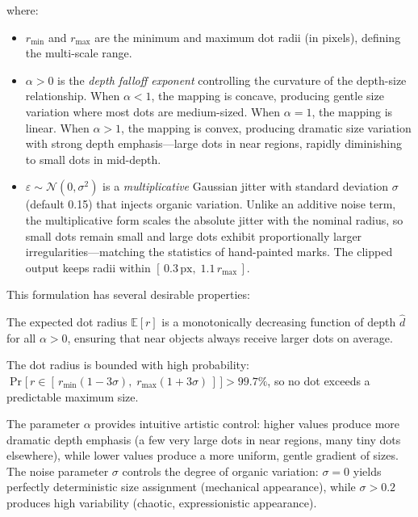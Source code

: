 \noindent where:
\begin{itemize}
    \item $r_{\min}$ and $r_{\max}$ are the minimum and maximum dot
    radii (in pixels), defining the multi-scale range.
    \item $\alpha > 0$ is the \emph{depth falloff exponent} controlling
    the curvature of the depth-size relationship. When $\alpha < 1$,
    the mapping is concave, producing gentle size variation where most
    dots are medium-sized. When $\alpha = 1$, the mapping is linear.
    When $\alpha > 1$, the mapping is convex, producing dramatic size
    variation with strong depth emphasis---large dots in near regions,
    rapidly diminishing to small dots in mid-depth.
    \item $\varepsilon \sim \mathcal{N}(0, \sigma^2)$ is a
    \emph{multiplicative} Gaussian jitter with standard deviation
    $\sigma$ (default 0.15) that injects organic variation. Unlike an
    additive noise term, the multiplicative form scales the absolute
    jitter with the nominal radius, so small dots remain small and
    large dots exhibit proportionally larger irregularities---matching
    the statistics of hand-painted marks. The clipped output keeps
    radii within $[\,0.3\,\mathrm{px},\; 1.1\, r_{\max}\,]$.
\end{itemize}

This formulation has several desirable properties:
\begin{proposition}[Monotonicity]
The expected dot radius $\mathbb{E}[r]$ is a monotonically decreasing
function of depth $\hat{d}$ for all $\alpha > 0$, ensuring that near
objects always receive larger dots on average.
\end{proposition}

\begin{proposition}[Boundedness]
The dot radius is bounded with high probability:
$\Pr\!\bigl[\, r \in [\,r_{\min}(1 - 3\sigma),\; r_{\max}(1 + 3\sigma)\,] \,\bigr] > 99.7\%$,
so no dot exceeds a predictable maximum size.
\end{proposition}

The parameter $\alpha$ provides intuitive artistic control: higher
values produce more dramatic depth emphasis (a few very large dots in
near regions, many tiny dots elsewhere), while lower values produce a
more uniform, gentle gradient of sizes. The noise parameter $\sigma$
controls the degree of organic variation: $\sigma = 0$ yields perfectly
deterministic size assignment (mechanical appearance), while $\sigma >
0.2$ produces high variability (chaotic, expressionistic appearance).

